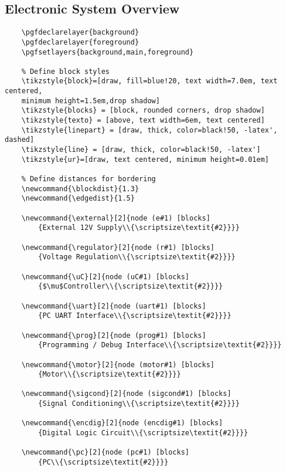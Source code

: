 \subsection{Electronic System Overview}
\begin{verbatim}
	\pgfdeclarelayer{background}
	\pgfdeclarelayer{foreground}
	\pgfsetlayers{background,main,foreground}
	
	% Define block styles  
	\tikzstyle{block}=[draw, fill=blue!20, text width=7.0em, text centered,
	minimum height=1.5em,drop shadow]
	\tikzstyle{blocks} = [block, rounded corners, drop shadow]
	\tikzstyle{texto} = [above, text width=6em, text centered]
	\tikzstyle{linepart} = [draw, thick, color=black!50, -latex', dashed]
	\tikzstyle{line} = [draw, thick, color=black!50, -latex']
	\tikzstyle{ur}=[draw, text centered, minimum height=0.01em]
	
	% Define distances for bordering
	\newcommand{\blockdist}{1.3}
	\newcommand{\edgedist}{1.5}
	
	\newcommand{\external}[2]{node (e#1) [blocks]
		{External 12V Supply\\{\scriptsize\textit{#2}}}}
	
	\newcommand{\regulator}[2]{node (r#1) [blocks]
		{Voltage Regulation\\{\scriptsize\textit{#2}}}}
	
	\newcommand{\uC}[2]{node (uC#1) [blocks]
		{$\mu$Controller\\{\scriptsize\textit{#2}}}}
	
	\newcommand{\uart}[2]{node (uart#1) [blocks]
		{PC UART Interface\\{\scriptsize\textit{#2}}}}
	
	\newcommand{\prog}[2]{node (prog#1) [blocks]
		{Programming / Debug Interface\\{\scriptsize\textit{#2}}}}
	
	\newcommand{\motor}[2]{node (motor#1) [blocks]
		{Motor\\{\scriptsize\textit{#2}}}}
	
	\newcommand{\sigcond}[2]{node (sigcond#1) [blocks]
		{Signal Conditioning\\{\scriptsize\textit{#2}}}}
	
	\newcommand{\encdig}[2]{node (encdig#1) [blocks]
		{Digital Logic Circuit\\{\scriptsize\textit{#2}}}}
	
	\newcommand{\pc}[2]{node (pc#1) [blocks]
		{PC\\{\scriptsize\textit{#2}}}}
	

\end{verbatim}
